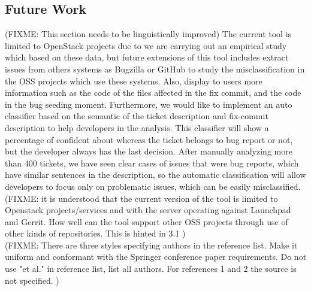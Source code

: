 \documentclass[runningheads,a4paper]{llncs}
\begin{document}
\subsection{Future Work}
\label{sec:5.1}


(FIXME: This section needs to be linguistically improved)
The current tool is limited to OpenStack projects due to we are carrying out an empirical study which based on these data, but future extensions of this tool includes extract issues from others systems as Bugzilla or GitHub to study the misclassification in the OSS projects which use these systems. Also, display to users more information such as the code of the files affected in the fix commit, and the code in the bug seeding moment. Furthermore, we would like to implement an auto classifier based on the semantic of the ticket description and fix-commit description to help developers in the analysis. This classifier will show a percentage of confident about whereas the ticket belongs to bug report or not, but the developer always has the last decision. After manually analyzing more than 400 tickets, we have seen clear cases of issues that were bug reports, which have similar sentences in the description, so the automatic classification will allow developers to focus only on problematic issues, which can be easily misclassified. \\
(FIXME: it is understood that the current version of the tool is limited to Openstack projects/services and with the server operating against Launchpad and Gerrit. How well can the tool support other OSS projects through use of other kinds of repositories. This is hinted in 3.1 )\\
(FIXME: There are three styles specifying authors in the reference list. Make it uniform and conformant with the Springer conference paper requirements. Do not use "et al." in reference list, list all authors. For references 1 and 2 the source is not specified.
)
\end{document}
